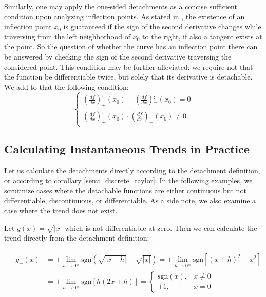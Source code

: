 \documentclass[11pt]{book}
\begin{document}
Similarly, one may apply the one-sided detachments as a concise
sufficient condition upon analyzing inflection points. As stated in
\cite{bronshtein2013handbook}, the existence of an inflection point $x_{0}$ is guaranteed if
the sign of the second derivative changes while traversing from the
left neighborhood of $x_{0}$ to the right, if also a tangent exists
at the point. So the question of whether the curve has an inflection
point there can be answered by checking the sign of the second derivative
traversing the considered point. This condition may be further alleviated:
we require not that the function be differentiable twice, but solely
that its derivative is detachable. We add to that the following condition:
\[
\begin{cases}
\left(\frac{df}{dx}\right)_{+}^{;}\left(x_{0}\right)+\left(\frac{df}{dx}\right){}_{-}^{;}\left(x_{0}\right)=0\\
\left(\frac{df}{dx}\right)_{+}^{;}\left(x_{0}\right)\cdot\left(\frac{df}{dx}\right)_{-}^{;}\left(x_{0}\right)\neq0.
\end{cases}
\]

\subsection{Calculating Instantaneous Trends in Practice}

Let us calculate the detachments directly according to the detachment definition, or according to corollary \ref{semi_discrete_taylor}. In the following examples, we scrutinize cases where the detachable functions are either continuous but not differentiable, discontinuous, or differentiable. As a side note, we also examine a case where the trend does not exist.

Let $g\left(x\right)=\sqrt{\left|x\right|}$ which is not differentiable at zero. Then we can calculate the trend directly from the detachment definition:

\begin{align}
&\begin{aligned}
g_{\pm}^{;}\left(x\right) & =\pm \underset{h\rightarrow0^{\pm}}{\lim}\text{sgn}\left(\sqrt{\left|x+h\right|}-\sqrt{\left|x\right|}\right)=\pm \underset{h\rightarrow0^{\pm}}{\lim}\text{sgn}\left[\left(x+h\right)^{2}-x^{2}\right]\\
& =\pm \underset{h\rightarrow0^{\pm}}{\lim}\text{sgn}\left[h\left(2x+h\right)\right]=\begin{cases}
\text{sgn}\left(x\right), & x\neq0\\
\pm 1, & x=0
\end{cases}
\end{aligned}
\end{align}
\end{document}
